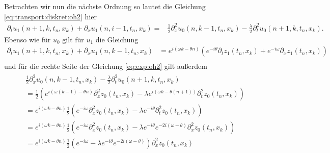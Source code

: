 Betrachten wir nun die nächste Ordnung so lautet die Gleichung \eqref{eq:transport:diskret:oh2} hier
\begin{align}\label{eq:exp:oh2}
\partial_t u_1(n+1, k, t_n, x_k)+ \partial_x u_1(n, i-1, t_n, x_k) =
&\frac {1}{2} \partial^2_x u_0(n, k-1, t_n, x_k) - \frac{\lambda}{2} \partial^2_t u_0(n+1, k, t_n, x_k).
\end{align}
Ebenso wie für $u_0$ gilt für $u_1$ die Gleichung
\begin{align*}
\partial_t u_1(n+1, k, t_n, x_k) + \partial_x u_1(n, k-1, t_n, x_k)
&= e^{i (\omega k - \theta n)}  \left( e^{- i \theta} \partial_t z_1(t_n, x_k) + e^{-i \omega} \partial_x z_1(t_n, x_k) \right)\\
\end{align*}
und für die rechte Seite der Gleichung \eqref{eq:exp:oh2} gilt außerdem
\begin{align}
\begin{split}
&\frac {1}{2} \partial^2_x u_0(n, k-1, t_n, x_k) -\frac {\lambda}{2} \partial^2_t u_0(n+1, k, t_n, x_k)\\
&= \frac {1}{2} \left( e^{i(\omega (k-1) - \theta n)} \partial^2_x z_0(t_n, x_k) - \lambda e^{i(\omega k - \theta (n+1))} \partial^2_t z_0(t_n,x_k) \right)\\
&= e^{i(\omega k - \theta n)} \frac {1}{2} \left( e^{-i \omega} \partial^2_x z_0(t_n, x_k) - \lambda e^{- i \theta} \partial^2_t z_0(t_n,x_k) \right)\\
&= e^{i(\omega k - \theta n)} \frac {1}{2} \left( e^{-i \omega} \partial^2_x z_0(t_n, x_k) - \lambda e^{- i \theta} e^{- 2i (\omega - \theta)} \partial^2_x z_0(t_n,x_k) \right)\\
&= e^{i(\omega k - \theta n)} \frac {1}{2} \left( e^{-i \omega} - \lambda e^{- i \theta} e^{- 2i (\omega - \theta)}\right) \partial^2_x z_0(t_n,x_k)
\end{split}
\end{align}
